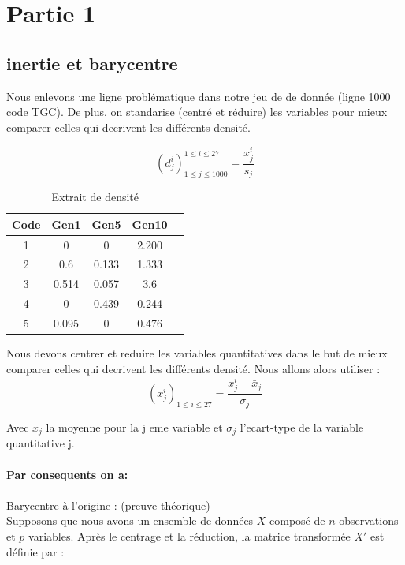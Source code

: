 \documentclass{article}
\begin{document}
\section{Partie 1}
\subsection{inertie et barycentre}

Nous enlevons une ligne problématique dans notre jeu de de donnée (ligne 1000 code TGC).
De plus, on standarise (centré et réduire) les variables pour mieux comparer celles qui decrivent les différents densité. 

\[
(d_j^i)_{1 \leq j \leq 1000}^{1 \leq i \leq 27} = \frac{x_j^i}{s_j}
\]

\begin{table}[h]
    \centering
    \caption{Extrait de densité}
    \label{tab:donnees_extrait}
    \begin{tabular}{|c|c|c|c|c|}
    \hline
    \textbf{Code} & \textbf{Gen1} & \textbf{Gen5} & \textbf{Gen10}\\
    \hline
    1 & 0 & 0 & 2.200 \\
    2 & 0.6 & 0.133 & 1.333  \\
    3 & 0.514 & 0.057 & 3.6 \\
    4 & 0 & 0.439 & 0.244 \\
    5 & 0.095 & 0 & 0.476 \\
    \hline
    \end{tabular}
    \end{table}



Nous devons centrer et reduire les variables quantitatives dans le but de mieux comparer celles qui decrivent les différents densité.
Nous allons alors utiliser :
\[
(x_j^i)_{1 \leq i \leq 27} = \frac{x_j^i - \bar{x}_j}{\sigma_j}
\]

Avec $\bar{x}_j$ la moyenne pour la j eme variable et  $\sigma_j$ l'ecart-type de la variable quantitative j.
\\
\\
\textbf{Par consequents on a:}
\\
\\
\underline{Barycentre à l'origine :} (preuve théorique)
\\

Supposons que nous avons un ensemble de données $X$ composé de $n$ observations et $p$ variables. Après le centrage et la réduction, la matrice transformée $X'$ est définie par :
\end{document}
